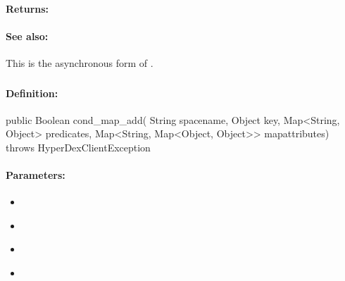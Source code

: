 \paragraph{Returns:}


\paragraph{See also:}  This is the asynchronous form of .

\pagebreak
\subsubsection{}
\label{api:java:cond_map_add}


\paragraph{Definition:}
\begin{javacode}
public Boolean cond_map_add(
        String spacename,
        Object key,
        Map<String, Object> predicates,
        Map<String, Map<Object, Object>> mapattributes) throws HyperDexClientException
\end{javacode}

\paragraph{Parameters:}
\begin{itemize}[noitemsep]
\item {}\\

\item {}\\

\item {}\\

\item {}\\

\end{itemize}

